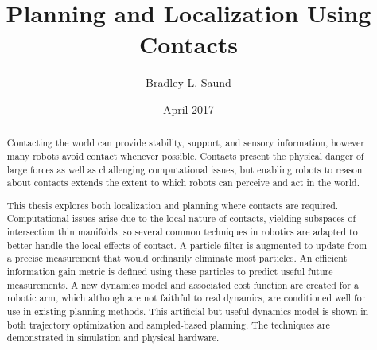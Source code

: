 \documentclass[hidelinks, 12pt]{cmuthesis}
\begin{document}
 
\frontmatter

\pagestyle{empty}

\title{ %
{\bf Planning and Localization Using Contacts}}
\author{Bradley L. Saund}
\date{April 2017}
\trnumber{}


\support{}
\disclaimer{}



\maketitle



\pagestyle{plain} %


\begin{abstract}
  Contacting the world can provide stability, support, and sensory information, however many robots avoid contact whenever possible.
  Contacts present the physical danger of large forces as well as challenging computational issues, but enabling robots to reason about contacts extends the extent to which robots can perceive and act in the world.

  This thesis explores both localization and planning where contacts are required.
  Computational issues arise due to the local nature of contacts, yielding subspaces of intersection thin manifolds, so several common techniques in robotics are adapted to better handle the local effects of contact.
  A particle filter is augmented to update from a precise measurement that would ordinarily eliminate most particles.
  An efficient information gain metric is defined using these particles to predict useful future measurements.
  A new dynamics model and associated cost function are created for a robotic arm, which although are not faithful to real dynamics, are conditioned well for use in existing planning methods.
  This artificial but useful dynamics model is shown in both trajectory optimization and sampled-based planning.
  The techniques are demonstrated in simulation and physical hardware.
\end{abstract}
\end{document}
